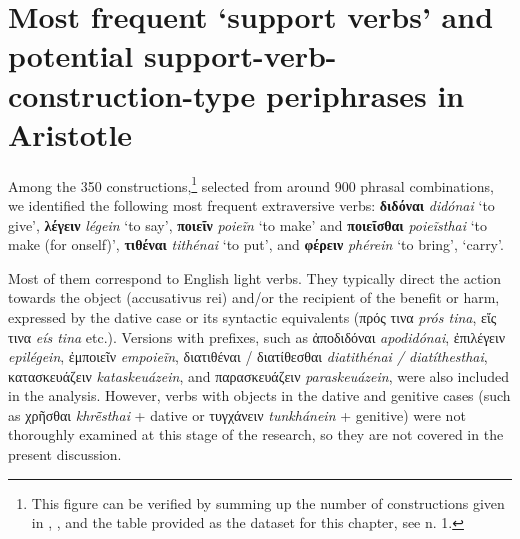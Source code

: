 \documentclass[output=paper,colorlinks,citecolor=brown]{langscibook}
\begin{document}
\section{Most frequent ‘support verbs’ and potential support-verb-construction-type periphrases in Aristotle}\label{Section6Rhet}

Among the 350 constructions,\footnote{This figure can be verified by summing up the number of constructions given in , , and the table provided as the dataset for this chapter, see n. 1.} selected from around 900 phrasal combinations, we identified the following most frequent extraversive verbs: \textbf{διδόναι} \textit{didónai} ‘to give’, \textbf{λέγειν} \textit{légein} ‘to say’, \textbf{ποιεῖν} \textit{poieĩn} ‘to make’ and \textbf{ποιεῖσθαι} \textit{poieĩsthai} ‘to make (for onself)’, \textbf{τιθέναι} \textit{tithénai} ‘to put’, and \textbf{φέρειν} \textit{phérein} ‘to bring’, ‘carry’.

Most of them correspond to English light verbs. They typically direct the action towards the object (accusativus rei) and/or the recipient of the benefit or harm, expressed by the dative case or its syntactic equivalents (πρός τινα \textit{prós tina}, εἴς τινα \textit{eís tina} etc.). Versions with prefixes, such as ἀποδιδόναι \textit{apodidónai}, ἐπιλέγειν \textit{epilégein}, ἐμποιεῖν \textit{empoieĩn}, διατιθέναι / διατίθεσθαι \textit{diatithénai / diatíthesthai}, κατασκευάζειν \textit{kataskeuázein}, and παρασκευάζειν \textit{paraskeuázein}, were also included in the analysis. However, verbs with objects in the dative and genitive cases (such as χρῆσθαι \textit{khrē̃sthai} + dative or τυγχάνειν \textit{tunkhánein} + genitive) were not thoroughly examined at this stage of the research, so they are not covered in the present discussion.
\end{document}
